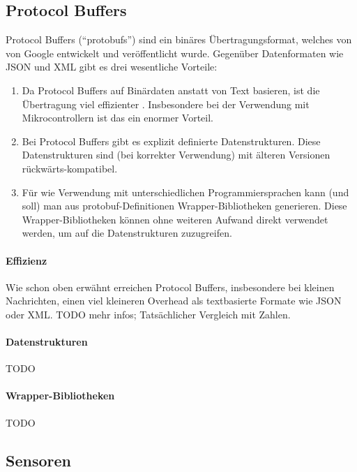 \subsection{Protocol Buffers}
\label{subsec:ueberblick_protobufs}
Protocol Buffers \cite{protobufs} (``protobufs'') sind ein binäres Übertragungsformat,
welches von von Google entwickelt und veröffentlicht wurde.
%
Gegenüber Datenformaten wie JSON und XML gibt es drei wesentliche Vorteile:
\begin{enumerate}
    \item Da Protocol Buffers auf Binärdaten anstatt von Text basieren,
    ist die Übertragung viel effizienter \cite{7765670}.
    Insbesondere bei der Verwendung mit Mikrocontrollern ist das ein enormer Vorteil.

    \item Bei Protocol Buffers gibt es explizit definierte Datenstrukturen.
    Diese Datenstrukturen sind (bei korrekter Verwendung) mit älteren Versionen rückwärts-kompatibel.

    \item Für wie Verwendung mit unterschiedlichen Programmiersprachen kann (und soll) man aus protobuf-Definitionen
    Wrapper-Bibliotheken generieren.
    Diese Wrapper-Bibliotheken können ohne weiteren Aufwand direkt verwendet werden,
    um auf die Datenstrukturen zuzugreifen.
\end{enumerate}

\paragraph{Effizienz}
Wie schon oben erwähnt erreichen Protocol Buffers,
insbesondere bei kleinen Nachrichten,
einen viel kleineren Overhead als textbasierte Formate wie JSON oder XML.
%
TODO mehr infos; Tatsächlicher Vergleich mit Zahlen.


\paragraph{Datenstrukturen}
TODO

\paragraph{Wrapper-Bibliotheken}
TODO

\subsection{Sensoren}
\label{subsec:ueberblick_sensors}

